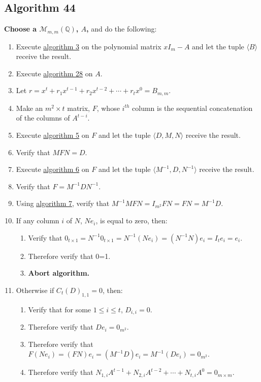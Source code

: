 \documentclass[twocolumn]{article}
\begin{document}
		\subsection{Algorithm 44}\label{sec:algorithm 44}
			\textbf{Choose a $\mathcal{M}_{m,m}(\mathbb{Q})$, $A$,} and do the following:
			\begin{enumerate}
				\item Execute \hyperref[sec:algorithm 3]{algorithm 3} on the polynomial matrix $xI_m-A$ and let the tuple $\langle B\rangle$ receive the result.
				\item Execute \hyperref[sec:algorithm 28]{algorithm 28} on $A$.
				\item Let $r=x^t+r_1x^{t-1}+r_2x^{t-2}+\cdots+r_tx^0=B_{m,m}$.
				\item Make an $m^2\times t$ matrix, $F$, whose $i^{th}$ column is the sequential concatenation of the columns of $A^{t-i}$.
				\item Execute \hyperref[sec:algorithm 5]{algorithm 5} on $F$ and let the tuple $\langle D,M,N\rangle$ receive the result.
				\item Verify that $MFN=D$.
				\item Execute \hyperref[sec:algorithm 6]{algorithm 6} on $F$ and let the tuple $\langle M^{-1},D,N^{-1}\rangle$ receive the result.
				\item Verify that $F=M^{-1}DN^{-1}$.
				\item Using \hyperref[sec:algorithm 7]{algorithm 7}, verify that $M^{-1}MFN=I_{m^2}FN=FN=M^{-1}D$.
				\item If any column $i$ of $N$, $Ne_i$, is equal to zero, then:
				\begin{enumerate}
					\item Verify that $0_{t\times 1}=N^{-1}0_{t\times 1}=N^{-1}(Ne_i)=(N^{-1}N)e_i=I_te_i=e_i$.
					\item Therefore verify that 0=1.
					\item \textbf{Abort algorithm.}
				\end{enumerate}
				\item Otherwise if ${C_t(D)}_{1,1}=0$, then:
				\begin{enumerate}
					\item Verify that for some $1\le i\le t$, $D_{i,i}=0$.
					\item Therefore verify that $De_i=0_{m^2}$.
					\item Therefore verify that $F(Ne_i)=(FN)e_i=(M^{-1}D)e_i=M^{-1}(De_i)=0_{m^2}$.
					\item Therefore verify that $N_{1,i}A^{t-1}+N_{2,i}A^{t-2}+\cdots+N_{t,i}A^0=0_{m\times m}$.

\end{enumerate}
\end{enumerate}
\end{document}

